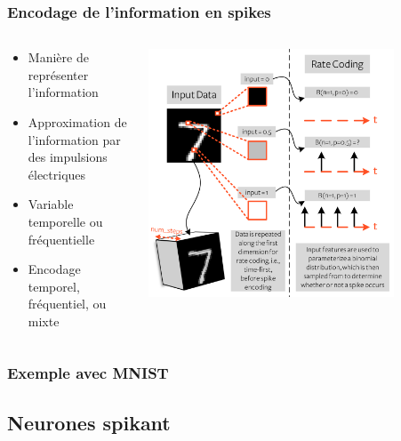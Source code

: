 \documentclass[aspectratio=169]{beamer}
\begin{document}
\begin{frame}
  \frametitle{Encodage de l'information en spikes}
  \begin{columns}
    \begin{column}{0.5\textwidth}
      \begin{itemize}
        \item Manière de représenter l'information
        \item Approximation de l'information par des impulsions électriques
        \item Variable temporelle ou fréquentielle
        \item Encodage temporel, fréquentiel, ou mixte
      \end{itemize}
    \end{column}
    \begin{column}{0.5\textwidth}
      \begin{center}
        \includegraphics[width=0.8\textwidth]{image/1_2_3_spikeconv.png}
      \end{center}
    \end{column}
  \end{columns}
\end{frame}

\begin{frame}
  \frametitle{Exemple avec MNIST}

\end{frame}

\subsection{Neurones spikant}
\end{document}
